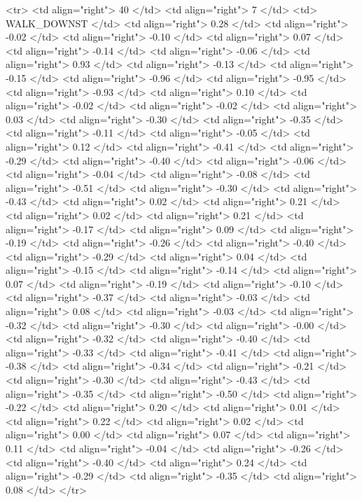   <tr> <td align="right"> 40 </td> <td align="right">   7 </td> <td> WALK_DOWNST </td> <td align="right"> 0.28 </td> <td align="right"> -0.02 </td> <td align="right"> -0.10 </td> <td align="right"> 0.07 </td> <td align="right"> -0.14 </td> <td align="right"> -0.06 </td> <td align="right"> 0.93 </td> <td align="right"> -0.13 </td> <td align="right"> -0.15 </td> <td align="right"> -0.96 </td> <td align="right"> -0.95 </td> <td align="right"> -0.93 </td> <td align="right"> 0.10 </td> <td align="right"> -0.02 </td> <td align="right"> -0.02 </td> <td align="right"> 0.03 </td> <td align="right"> -0.30 </td> <td align="right"> -0.35 </td> <td align="right"> -0.11 </td> <td align="right"> -0.05 </td> <td align="right"> 0.12 </td> <td align="right"> -0.41 </td> <td align="right"> -0.29 </td> <td align="right"> -0.40 </td> <td align="right"> -0.06 </td> <td align="right"> -0.04 </td> <td align="right"> -0.08 </td> <td align="right"> -0.51 </td> <td align="right"> -0.30 </td> <td align="right"> -0.43 </td> <td align="right"> 0.02 </td> <td align="right"> 0.21 </td> <td align="right"> 0.02 </td> <td align="right"> 0.21 </td> <td align="right"> -0.17 </td> <td align="right"> 0.09 </td> <td align="right"> -0.19 </td> <td align="right"> -0.26 </td> <td align="right"> -0.40 </td> <td align="right"> -0.29 </td> <td align="right"> 0.04 </td> <td align="right"> -0.15 </td> <td align="right"> -0.14 </td> <td align="right"> 0.07 </td> <td align="right"> -0.19 </td> <td align="right"> -0.10 </td> <td align="right"> -0.37 </td> <td align="right"> -0.03 </td> <td align="right"> 0.08 </td> <td align="right"> -0.03 </td> <td align="right"> -0.32 </td> <td align="right"> -0.30 </td> <td align="right"> -0.00 </td> <td align="right"> -0.32 </td> <td align="right"> -0.40 </td> <td align="right"> -0.33 </td> <td align="right"> -0.41 </td> <td align="right"> -0.38 </td> <td align="right"> -0.34 </td> <td align="right"> -0.21 </td> <td align="right"> -0.30 </td> <td align="right"> -0.43 </td> <td align="right"> -0.35 </td> <td align="right"> -0.50 </td> <td align="right"> -0.22 </td> <td align="right"> 0.20 </td> <td align="right"> 0.01 </td> <td align="right"> 0.22 </td> <td align="right"> 0.02 </td> <td align="right"> 0.00 </td> <td align="right"> 0.07 </td> <td align="right"> 0.11 </td> <td align="right"> -0.04 </td> <td align="right"> -0.26 </td> <td align="right"> -0.40 </td> <td align="right"> 0.24 </td> <td align="right"> -0.29 </td> <td align="right"> -0.35 </td> <td align="right"> 0.08 </td> </tr>
